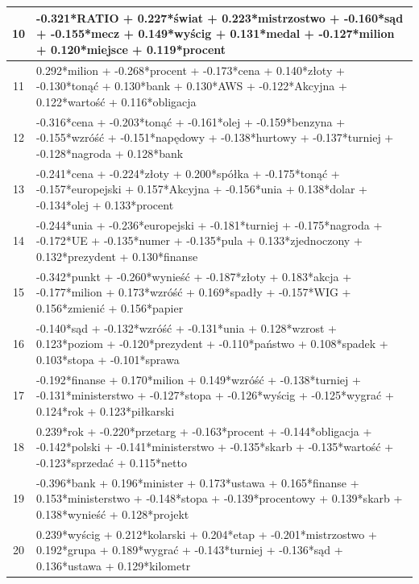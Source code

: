 \documentclass[11pt,a4paper]{article}
\begin{document}
\begin{table}[h]
\begin{tabular}{|c|>{\footnotesize}p{\linewidth}|}
10 & -0.321*RATIO + 0.227*świat + 0.223*mistrzostwo + -0.160*sąd + -0.155*mecz + 0.149*wyścig + 0.131*medal + -0.127*milion + 0.120*miejsce + 0.119*procent\\\hline
11 & 0.292*milion + -0.268*procent + -0.173*cena + 0.140*złoty + -0.130*tonąć + 0.130*bank + 0.130*AWS + -0.122*Akcyjna + 0.122*wartość + 0.116*obligacja\\\hline
12 & -0.316*cena + -0.203*tonąć + -0.161*olej + -0.159*benzyna + -0.155*wzróść + -0.151*napędowy + -0.138*hurtowy + -0.137*turniej + -0.128*nagroda + 0.128*bank\\\hline
13 & -0.241*cena + -0.224*złoty + 0.200*spółka + -0.175*tonąć + -0.157*europejski + 0.157*Akcyjna + -0.156*unia + 0.138*dolar + -0.134*olej + 0.133*procent\\\hline
14 & -0.244*unia + -0.236*europejski + -0.181*turniej + -0.175*nagroda + -0.172*UE + -0.135*numer + -0.135*pula + 0.133*zjednoczony + 0.132*prezydent + 0.130*finanse\\\hline
15 & -0.342*punkt + -0.260*wynieść + -0.187*złoty + 0.183*akcja + -0.177*milion + 0.173*wzróść + 0.169*spadły + -0.157*WIG + 0.156*zmienić + 0.156*papier\\\hline
16 & -0.140*sąd + -0.132*wzróść + -0.131*unia + 0.128*wzrost + 0.123*poziom + -0.120*prezydent + -0.110*państwo + 0.108*spadek + 0.103*stopa + -0.101*sprawa\\\hline
17 & -0.192*finanse + 0.170*milion + 0.149*wzróść + -0.138*turniej + -0.131*ministerstwo + -0.127*stopa + -0.126*wyścig + -0.125*wygrać + 0.124*rok + 0.123*piłkarski\\\hline
18 & 0.239*rok + -0.220*przetarg + -0.163*procent + -0.144*obligacja + -0.142*polski + -0.141*ministerstwo + -0.135*skarb + -0.135*wartość + -0.123*sprzedać + 0.115*netto\\\hline
19 & -0.396*bank + 0.196*minister + 0.173*ustawa + 0.165*finanse + 0.153*ministerstwo + -0.148*stopa + -0.139*procentowy + 0.139*skarb + 0.138*wynieść + 0.128*projekt\\\hline
20 & 0.239*wyścig + 0.212*kolarski + 0.204*etap + -0.201*mistrzostwo + 0.192*grupa + 0.189*wygrać + -0.143*turniej + -0.136*sąd + 0.136*ustawa + 0.129*kilometr\\\hline
\end{tabular}
\end{table}
\end{document}
